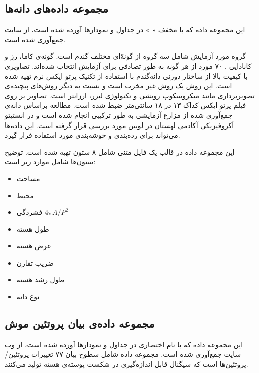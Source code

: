 \subsection{
مجموعه داده‌های دانه‌ها
}

این مجموعه داده که با مخفف «%
%
» در جداول و نمودارها آورده شده است، از سایت 
\cite{uci_seeds}
جمع‌آوری شده است.

گروه مورد آزمایش شامل سه گروه از گونه‌ّای مختلف گندم است. گونه‌ی کاما، رز و کانادایی%
%
. ۷۰ مورد از هر گونه به طور تصادفی برای آزمایش انتخاب شده‌اند. تصاویری با کیفیت بالا از ساختار دورنی دانه‌گندم با استفاده از تکنیک پرتو ایکس نرم%
تهیه شده است. این روش یک روش غیر مخرب است و نسبت به دیگر روش‌های پیچیده‌ی تصویربرداری مانند میکروسکوپ روبشی و تکنولوژی لیزر، ارزانتر است. تصاویر بر روی فیلم پرتو ایکس کداک ۱۳ در ۱۸ سانتی‌متر ضبط شده است. مطالعه براساس دانه‌ی جمع‌آوری شده از مزارع آزمایشی به طور ترکیبی انجام شده است و در انستیتو آکروفیزیکی آکادمی لهستان در لوبین مورد بررسی قرار گرفته است.%
این داده‌ها می‌تواند برای رده‌بندی و خوشه‌بندی مورد استفاده قرار گیرد.

این مجموعه داده در قالب یک فایل متنی شامل ۸ ستون تهیه شده است. توضیح ستون‌ها شامل موارد زیر است:

\begin{itemize}
\item
{}
مساحت
\item
{}
محیط
\item
{}
فشردگی 
$4 \pi A / P^2$
\item
{}
طول هسته
\item
{}
عرض هسته
\item
{}
ضریب تقارن
\item
{}
طول رشد هسته
\item
{}
نوع دانه
\end{itemize}

\subsection{
مجموعه داده‌ی بیان پروتئین موش
}

این مجموعه داده که با نام اختصاری 
در جداول و نمودارها آورده شده است، از وب سایت
\cite{uci_MPE}
جمع‌آوری شده است. مجموعه داده شامل سطوح بیان ۷۷ تغییرات پروتئین/پروتئین‌ها است که سیگنال قابل اندازه‌گیری در شکست پوسته‌ی هسته تولید می‌کنند.

